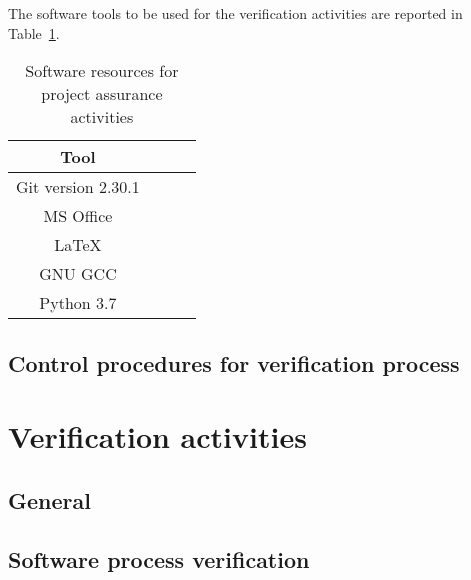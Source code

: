 The software tools to be used for the verification activities are reported in Table~\ref{table:verification_tools}.

\begin{table}[H]
\centering
\begin{tabular}{||c|c|c|c||}
 \hline
 \textbf{Tool} \\
 \hline
 Git version 2.30.1 \\
 \hline
 MS Office \\
 \hline
 LaTeX  \\
 \hline
 GNU GCC \\
 \hline
 Python 3.7 \\
 \hline

\end{tabular}
\caption{Software resources for project assurance activities}
\label{table:verification_tools}
\end{table}

\subsection{Control procedures for verification process}


\section{Verification activities}

\subsection{General}


\subsection{Software process verification}


